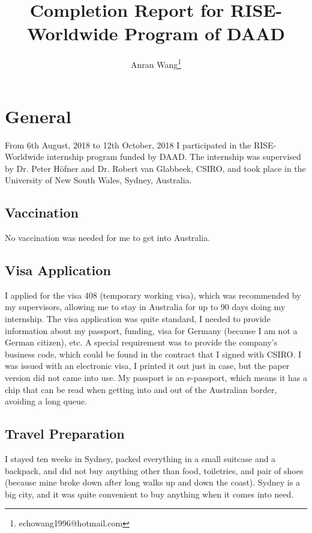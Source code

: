 \documentclass[adraft]{eptcs}
\begin{document}
\title{Completion Report for RISE-Worldwide Program of DAAD}
\def\titlerunning{Report}
\author{Anran Wang\footnote{echowang1996@hotmail.com}}
\def\authorrunning{Anran Wang}
\maketitle

\section{General}
From 6th August, 2018 to 12th October, 2018 I participated in the RISE-Worldwide internship program funded by DAAD. The internship was supervised by Dr. Peter H\"ofner and Dr. Robert van Glabbeek, CSIRO, and took place in the University of New South Wales, Sydney, Australia.  

\subsection{Vaccination}
No vaccination was needed for me to get into Australia. 

\subsection{Visa Application}
I applied for the visa 408 (temporary working visa), which was recommended by my supervisors, allowing me to stay in Australia for up to 90 days doing my internship. The visa application was quite standard, I needed to provide information about my passport, funding, visa for Germany (because I am not a German citizen), etc. A special requirement was to provide the company's business code, which could be found in the contract that I signed with CSIRO. I was issued with an electronic visa, I printed it out just in case, but the paper version did not came into use. My passport is an e-passport, which means it has a chip that can be read when getting into and out of the Australian border, avoiding a long queue. 

\subsection{Travel Preparation}
I stayed ten weeks in Sydney, packed everything in a small suitcase and a backpack, and did not buy anything other than food, toiletries, and pair of shoes (because mine broke down after long walks up and down the coast). Sydney is a big city, and it was quite convenient to buy anything when it comes into need. 
\end{document}
